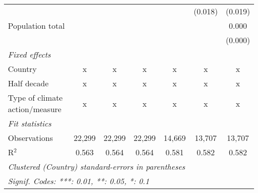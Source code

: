 \begin{tabular}{lcccccc}
                                                                                      &                &                &                &                & (0.018)        & (0.019)\\   
   Population total                                                                   &                &                &                &                &                & 0.000\\   
                                                                                      &                &                &                &                &                & (0.000)\\   
   \emph{Fixed effects}\\
   Country                                                                            & x              & x              & x              & x              & x              & x\\  
   Half decade                                                                        & x              & x              & x              & x              & x              & x\\  
   Type of climate action/measure                                                     & x              & x              & x              & x              & x              & x\\  
   \midrule \emph{Fit statistics}\\
   Observations                                                                       & 22,299         & 22,299         & 22,299         & 14,669         & 13,707         & 13,707\\  
   R$^2$                                                                              & 0.563          & 0.564          & 0.564          & 0.581          & 0.582          & 0.582\\  
   \midrule
   \multicolumn{7}{l}{\emph{Clustered (Country) standard-errors in parentheses}}\\
   \multicolumn{7}{l}{\emph{Signif. Codes: ***: 0.01, **: 0.05, *: 0.1}}\\
\end{tabular}
\par\endgroup


